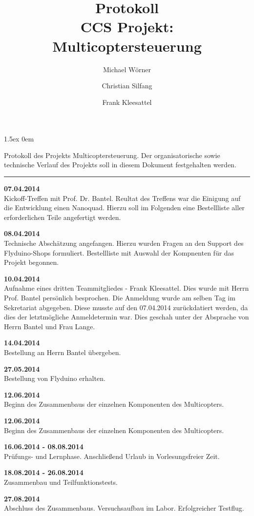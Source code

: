 \documentclass[a4paper,12pt]{article}
\begin{document}
\title{
\textbf{Protokoll}\\
CCS Projekt: Multicoptersteuerung}
\author{Michael Wörner \and Christian Silfang \and Frank Kleesattel}
\date{}

\parskip1.5ex
\parindent0em

\maketitle

Protokoll des Projekts \glqq Multicoptersteuerung\grqq. Der organisatorische sowie technische Verlauf des Projekts soll in diesem Dokument festgehalten werden.

\noindent\rule[1ex]{\textwidth}{1pt}
\vspace{1cm}

\textbf{07.04.2014}\\
Kickoff-Treffen mit Prof. Dr. Bantel. Reultat des Treffens war die Einigung auf die Entwicklung einen Nanoquad. Hierzu soll im Folgenden eine Bestellliste aller erforderlichen Teile angefertigt werden.

\textbf{08.04.2014}\\
Technische Abschätzung angefangen. Hierzu wurden Fragen an den Support des Flyduino-Shops formuliert.
Bestellliste mit Auswahl der Kompnenten für das Projekt begonnen.

\textbf{10.04.2014}\\
Aufnahme eines dritten Teammitgliedes - Frank Kleesattel. Dies wurde mit Herrn Prof. Bantel
persönlich besprochen. Die Anmeldung wurde am selben Tag im Sekretariat abgegeben. Diese musste 
auf den 07.04.2014 zurückdatiert werden, da dies der letztmögliche Anmeldetermin war. Dies geschah
unter der Absprache von Herrn Bantel und Frau Lange.

\textbf{14.04.2014}\\
Bestellung an Herrn Bantel übergeben.

\textbf{27.05.2014}\\
Bestellung von Flyduino erhalten.

\textbf{12.06.2014}\\
Beginn des Zusammenbaus der einzelnen Komponenten des Multicopters.

\textbf{12.06.2014}\\
Beginn des Zusammenbaus der einzelnen Komponenten des Multicopters.
\newpage

\textbf{16.06.2014 - 08.08.2014}\\
Prüfungs- und Lernphase. Anschließend Urlaub in Vorlesungsfreier Zeit.

\textbf{18.08.2014 - 26.08.2014}\\
Zusammenbau und Teilfunktionstests.

\textbf{27.08.2014}\\
Abschluss des Zusammenbaus. Versuchsaufbau im Labor. Erfolgreicher Testflug.
\end{document}
